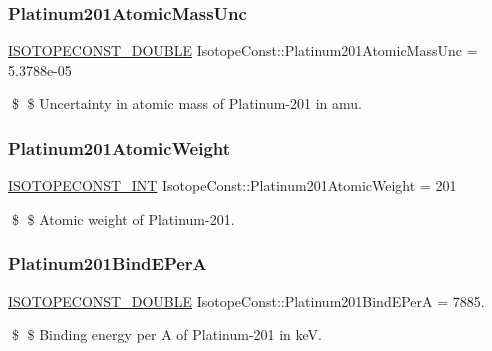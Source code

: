 \subsubsection{\texorpdfstring{Platinum201\+Atomic\+Mass\+Unc}{Platinum201AtomicMassUnc}}
{\footnotesize\ttfamily \mbox{\hyperlink{group___isotope_const-_macros_ga8f45a7272ce02c0b4c65c44636ed719a}{I\+S\+O\+T\+O\+P\+E\+C\+O\+N\+S\+T\+\_\+\+D\+O\+U\+B\+LE}} Isotope\+Const\+::\+Platinum201\+Atomic\+Mass\+Unc = 5.\+3788e-\/05}

\$ \$ Uncertainty in atomic mass of Platinum-\/201 in amu. \mbox{\label{group___isotope_const-_platinum-_pt201_gad63b206dbfcaa5f025e441d12e67b800}} 
\subsubsection{\texorpdfstring{Platinum201\+Atomic\+Weight}{Platinum201AtomicWeight}}
{\footnotesize\ttfamily \mbox{\hyperlink{group___isotope_const-_macros_ga5f18360b3e99483a35c32d789e62621c}{I\+S\+O\+T\+O\+P\+E\+C\+O\+N\+S\+T\+\_\+\+I\+NT}} Isotope\+Const\+::\+Platinum201\+Atomic\+Weight = 201}

\$ \$ Atomic weight of Platinum-\/201. \mbox{\label{group___isotope_const-_platinum-_pt201_ga6adaf23ba94811c66b77313e54f1426f}} 
\subsubsection{\texorpdfstring{Platinum201\+Bind\+E\+PerA}{Platinum201BindEPerA}}
{\footnotesize\ttfamily \mbox{\hyperlink{group___isotope_const-_macros_ga8f45a7272ce02c0b4c65c44636ed719a}{I\+S\+O\+T\+O\+P\+E\+C\+O\+N\+S\+T\+\_\+\+D\+O\+U\+B\+LE}} Isotope\+Const\+::\+Platinum201\+Bind\+E\+PerA = 7885.}

\$ \$ Binding energy per A of Platinum-\/201 in keV. \mbox{\label{group___isotope_const-_platinum-_pt201_ga5b5f79090d4fe9e8dc25123a66d8c3eb}} 
